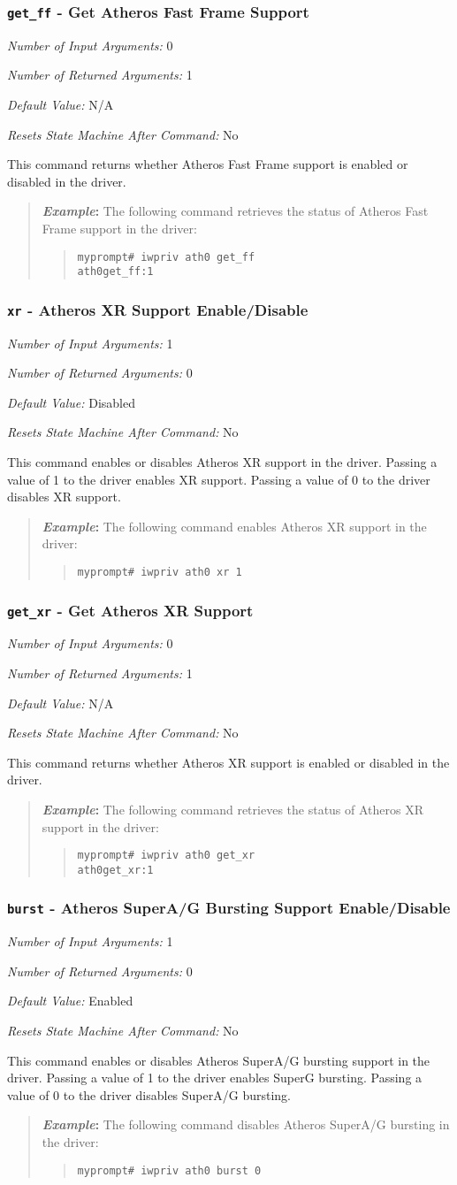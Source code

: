 \documentclass[10pt,fullpage]{article}
\newcommand{\mytt}[1]{{\texttt{#1}}}
\newcommand{\bv}{\begin{verse}}
\newcommand{\ev}{\end{verse}}
\newcommand{\cmd}[1]{{\texttt{myprompt\# #1}}}
\newcommand{\argdesc}[4]{\begin{description}
\itemsep -6pt
\item \textit{Number of Input Arguments:} #1
\item \textit{Number of Returned Arguments:} #2
\item \textit{Default Value:} #3
\item \textit{Resets State Machine After Command:} #4
\end{description}
}
\newenvironment{example}{\begin{quote}\textbf{\textit{Example}:}}{\end{quote}}
\begin{document}
\subsubsection{\mytt{get\_ff} - Get Atheros Fast Frame Support}
\argdesc{0}{1}{N/A}{No}
This command returns whether Atheros Fast Frame support is enabled or
disabled in the driver.
\begin{example}
The following command retrieves the status of Atheros Fast Frame
support in the driver:
\bv
\cmd{iwpriv ath0 get\_ff}\\
\mytt{ath0\hspace{32pt}get\_ff:1}
\ev
\end{example}

\subsubsection{\mytt{xr} - Atheros XR Support Enable/Disable}
\argdesc{1}{0}{Disabled}{No}
This command enables or disables Atheros XR support in the driver.
Passing a value of 1 to the driver enables XR support. Passing a value
of 0 to the driver disables XR support.
\begin{example}
The following command enables Atheros XR support in the driver:
\bv
\cmd{iwpriv ath0 xr 1}
\ev
\end{example}

\subsubsection{\mytt{get\_xr} - Get Atheros XR Support}
\argdesc{0}{1}{N/A}{No}
This command returns whether Atheros XR support is enabled or disabled
in the driver.
\begin{example}
The following command retrieves the status of Atheros XR support in
the driver:
\bv
\cmd{iwpriv ath0 get\_xr}\\
\mytt{ath0\hspace{32pt}get\_xr:1}
\ev
\end{example}

\subsubsection{\mytt{burst} - Atheros SuperA/G Bursting Support
  Enable/Disable}
\argdesc{1}{0}{Enabled}{No}
This command enables or disables Atheros SuperA/G bursting support in the driver.
Passing a value of 1 to the driver enables SuperG bursting. Passing a value
of 0 to the driver disables SuperA/G bursting.
\begin{example}
The following command disables Atheros SuperA/G bursting in the driver:
\bv
\cmd{iwpriv ath0 burst 0}
\ev
\end{example}
\end{document}
